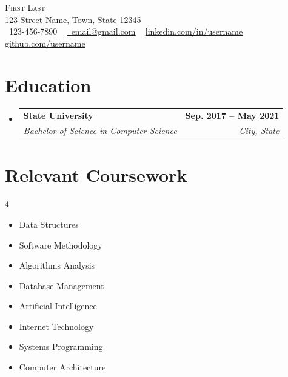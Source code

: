 \documentclass[letterpaper,11pt]{article}
\makeatletter
\newcommand{\resumeSubheading}[4]{
  \vspace{-2pt}\item
    \begin{tabular*}{1.0\textwidth}[t]{l@{\extracolsep{\fill}}r}
      \textbf{#1} & \textbf{\small #2} \\
      \textit{\small#3} & \textit{\small #4} \\
    \end{tabular*}\vspace{-7pt}
}
\newcommand{\resumeSubHeadingListStart}{\begin{itemize}[leftmargin=0.0in, label={}]}
\newcommand{\resumeSubHeadingListEnd}{\end{itemize}}
\makeatother
\begin{document}

\begin{center}
    {\Huge \scshape First Last} \\ \vspace{1pt}
    123 Street Name, Town, State 12345 \\ \vspace{1pt}
    \small \raisebox{-0.1\height}\Telefon\ 123-456-7890 ~ \href{mailto:x@gmail.com}{\raisebox{-0.2\height}\Letter\  \uline{email@gmail.com}} ~
    \href{https://linkedin.com/in//}{\uline{linkedin.com/in/username}}  ~
    \href{https://github.com/}{\uline{github.com/username}}
    \vspace{-8pt}
\end{center}


\section{Education}
  \resumeSubHeadingListStart
    \resumeSubheading
      {State University}{Sep. 2017 -- May 2021}
      {Bachelor of Science in Computer Science}{City, State}
  \resumeSubHeadingListEnd

\section{Relevant Coursework}
        \begin{multicols}{4}
            \begin{itemize}[itemsep=-5pt, parsep=3pt]
                \item\small Data Structures
                \item Software Methodology
                \item Algorithms Analysis
                \item Database Management
                \item Artificial Intelligence
                \item Internet Technology
                \item Systems Programming
                \item Computer Architecture
            \end{itemize}
        \end{multicols}
        \vspace*{2.0\multicolsep}
\end{document}
